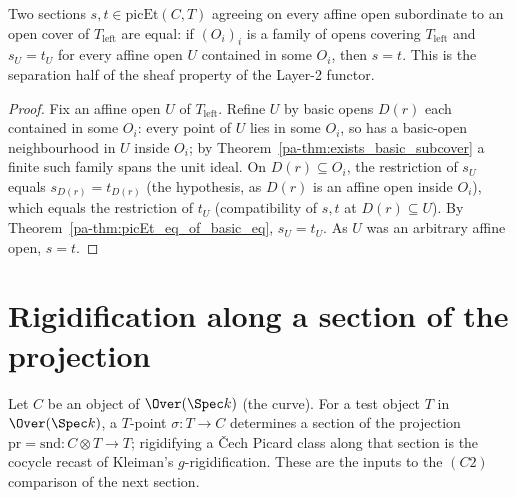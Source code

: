 \begin{theorem}
  \label{pa-thm:picEt_ext_of_le_cover}
  \leanok

  Two sections \(s, t \in \mathrm{picEt}(C, T)\) agreeing on every affine open subordinate to an
  open cover of \(T_{\mathrm{left}}\) are equal: if \((O_i)_{i}\) is a family of opens covering
  \(T_{\mathrm{left}}\) and \(s_U = t_U\) for every affine open \(U\) contained in some \(O_i\),
  then \(s = t\). This is the separation half of the sheaf property of the Layer-2 functor.
\end{theorem}
\begin{proof}
  \leanok
  Fix an affine open \(U\) of \(T_{\mathrm{left}}\). Refine \(U\) by basic opens \(D(r)\) each
  contained in some \(O_i\): every point of \(U\) lies in some \(O_i\), so has a basic-open
  neighbourhood in \(U\) inside \(O_i\); by Theorem~\ref{pa-thm:exists_basic_subcover} a finite such
  family spans the unit ideal. On \(D(r) \subseteq O_i\), the restriction of \(s_U\) equals
  \(s_{D(r)} = t_{D(r)}\) (the hypothesis, as \(D(r)\) is an affine open inside \(O_i\)), which
  equals the restriction of \(t_U\) (compatibility of \(s, t\) at \(D(r) \subseteq U\)). By
  Theorem~\ref{pa-thm:picEt_eq_of_basic_eq}, \(s_U = t_U\). As \(U\) was an arbitrary affine open,
  \(s = t\).
\end{proof}

\section{Rigidification along a section of the projection}
\label{pa-sec:rigidification}

Let \(C\) be an object of \(\Over(\Spec k)\) (the curve). For a test object \(T\) in
\(\Over(\Spec k)\), a \(T\)-point \(\sigma \colon T \to C\) determines a section of the
projection \(\mathrm{pr} = \mathrm{snd} \colon C \otimes T \to T\); rigidifying a \v Cech Picard
class along that section is the cocycle recast of Kleiman's \(g\)-rigidification. These are the
inputs to the \((C2)\) comparison of the next section.

